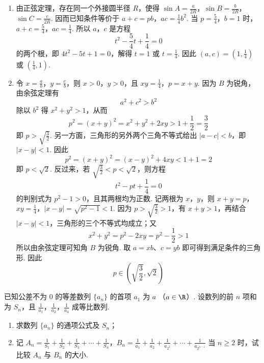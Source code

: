 \begin{solution}
\begin{enumerate}
\item
由正弦定理，存在同一个外接圆半径 \(R\)，使得 \(\sin A=\frac{a}{2R}\)，\(\sin B=\frac{b}{2R}\)，\(\sin C=\frac{c}{2R}\). 因而已知条件等价于
\(a+c=pb\)，\(ac=\frac{1}{4}b^2\).
当 \(p=\frac{5}{4}\)，\(b=1\) 时，\(a+c=\frac{5}{4}\)，\(ac=\frac{1}{4}\). 所以 \(a\)，\(c\) 是方程
\[
t^2-\frac{5}{4}t+\frac{1}{4}=0
\]
的两个根，即 \(4t^2-5t+1=0\)，解得 \(t=1\) 或 \(t=\frac{1}{4}\). 因此 \((a,c)=(1,\frac{1}{4})\) 或 \((\frac{1}{4},1)\).

\item
令 \(x=\frac{a}{b}\)，\(y=\frac{c}{b}\)，则 \(x>0\)，\(y>0\)，且 \(xy=\frac{1}{4}\)，\(p=x+y\). 因为 \(B\) 为锐角，由余弦定理有
\[
a^2+c^2>b^2
\]
除以 \(b^2\) 得 \(x^2+y^2>1\)，从而
\[
p^2=(x+y)^2=x^2+y^2+2xy>1+\frac{1}{2}=\frac{3}{2}
\]
即 \(p>\sqrt{\frac{3}{2}}\). 另一方面，三角形的另外两个三角不等式给出 \(\lvert a-c\rvert<b\)，即 \(\lvert x-y\rvert<1\). 因此
\[
p^2=(x+y)^2=(x-y)^2+4xy<1+1=2
\]
即 \(p<\sqrt{2}\). 反过来，若 \(\sqrt{\frac{3}{2}}<p<\sqrt{2}\)，则方程
\[
t^2-pt+\frac{1}{4}=0
\]
的判别式为 \(p^2-1>0\)，且其两根均为正数. 记两根为 \(x\)，\(y\)，则
\(x+y=p\)，\(xy=\frac{1}{4}\)，\(\lvert x-y\rvert=\sqrt{p^2-1}<1\).
因为 \(p>\sqrt{\frac{3}{2}}>1\)，有 \(x+y>1\)，再结合 \(\lvert x-y\rvert<1\)，三角形的三个不等式均成立；又
\[
x^2+y^2=p^2-2xy=p^2-\frac{1}{2}>1
\]
所以由余弦定理可知角 \(B\) 为锐角. 取 \(a=xb\)、\(c=yb\) 即可得到满足条件的三角形. 因此
\[
p\in\left(\sqrt{\frac{3}{2}},\sqrt{2}\right)
\]
\end{enumerate}
\end{solution}

\begin{problem}
已知公差不为 \(0\) 的等差数列 \(\{a_{n}\}\) 的首项 \(a_{1}\) 为 \(a\) （\(a\in\R\)）. 设数列的前 \(n\) 项和为 \(S_{n}\)，且 \(\frac{1}{a_{1}}\)，\(\frac{1}{a_{2}}\)，\(\frac{1}{a_{4}}\) 成等比数列.
\begin{enumerate}
\item 求数列 \( \{a_{n}\} \) 的通项公式及 \( S_{n} \)；
\item 记 \(A_{n} = \frac{1}{S_{1}} + \frac{1}{S_{2}} + \frac{1}{S_{3}} + \cdots + \frac{1}{S_{n}}\)，\(B_{n} = \frac{1}{a_{1}} + \frac{1}{a_{2}} + \frac{1}{a_{2^{2}}} + \cdots + \frac{1}{a_{2^{n-1}}}\) 当 \(n \geqslant 2\) 时，试比较 \(A_{n}\) 与 \(B_{n}\) 的大小.
\end{enumerate}
\end{problem}

